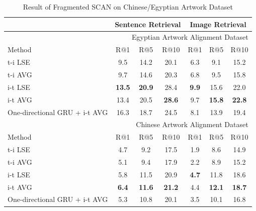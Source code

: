 \begin{table}[h!]
\centering
\begin{tabular}{lcccccc}
\hline
\hline
\multicolumn{1}{c}{} & \multicolumn{3}{c}{Sentence Retrieval} & \multicolumn{3}{c}{Image Retrieval} \\ \hline\hline
\multicolumn{7}{r}{Egyptian Artwork Alignment Dataset}                                              \\ \hline
Method               & R@1         & R@5         & R@10       & R@1        & R@5        & R@10      \\ \hline
t-i LSE              & 9.5        & 14.2        & 20.1       & 6.3       & 9.1       & 15.2      \\ \hline
t-i AVG              & 9.7        & 14.6        & 20.3       & 6.8       & 9.5       & 15.8      \\ \hline
i-t LSE              & \textbf{13.5}        & \textbf{20.9}        & 28.4       & \textbf{9.9}       & 15.6       & 22.0      \\ \hline
i-t AVG              & 13.4        & 20.5        & \textbf{28.6}       & 9.7       & \textbf{15.8}       & \textbf{22.8}      \\ \hline
One-directional GRU + i-t AVG  & 16.3        & 18.7        & 24.5       & 8.1       & 13.9       & 19.4      \\ \hline\hline
\multicolumn{7}{r}{Chinese Artwork Alignment Dataset}                                               \\ \hline
Method               & R@1         & R@5         & R@10       & R@1        & R@5        & R@10      \\ \hline
t-i LSE              & 4.7         & 9.2        & 17.5       & 1.9        & 8.6       & 14.9      \\ \hline
t-i AVG              & 5.1         & 9.4        & 17.9       & 2.2        & 8.9       & 15.2      \\ \hline
i-t LSE              & 5.8         & 11.5        & 20.9       & \textbf{4.7}        & 11.8       & 18.6      \\ \hline
i-t AVG              & \textbf{6.4}         & \textbf{11.6}        & \textbf{21.2}       & 4.4        & \textbf{12.1}       & \textbf{18.7}      \\ \hline
One-directional GRU + i-t AVG  & 5.3         & 10.8        & 20.1       & 3.5        & 10.1       & 16.8      \\ \hline
\end{tabular}
\caption{Result of Fragmented SCAN on Chinese/Egyptian Artwork Dataset}
\label{table:resultfragmented}
\end{table}

